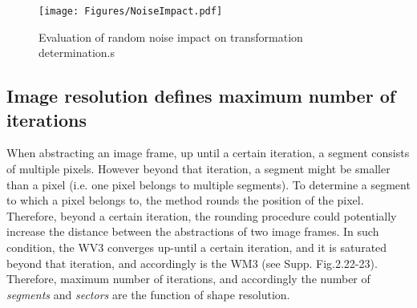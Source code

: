 \begin{figure}[!t]
	\centering
	\texttt{[image: Figures/NoiseImpact.pdf]}
	\caption
	{
		Evaluation of random noise impact on transformation determination.s
	}
	\label{Figure: NoiseImpact}
\end{figure}


\subsection{Image resolution defines maximum number of iterations}
When abstracting an image frame, up until a certain iteration, a segment consists of multiple pixels. However beyond that iteration, a segment might be smaller than a pixel (i.e. one pixel belongs to multiple segments). To determine a segment to which a pixel belongs to, the method rounds the position of the pixel. Therefore, beyond a certain iteration, the rounding procedure could potentially increase the distance between the abstractions of two image frames. In such condition, the WV3 converges up-until a certain iteration, and it is saturated beyond that iteration, and accordingly is the WM3 (see Supp. Fig.2.22-23). Therefore, maximum number of iterations, and accordingly the number of \textit{segments} and \textit{sectors} are the function of shape resolution. 


